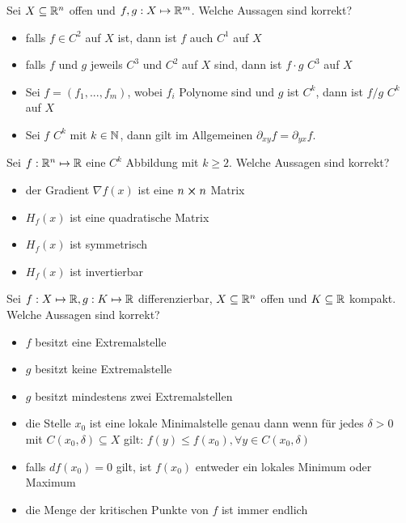 \hrulefill

Sei $X \subseteq \mathbb{R}^n$ offen und $f,g: X \mapsto \mathbb{R}^m$. Welche Aussagen sind korrekt?
\begin{itemize}
    \item[\rlap{\raisebox{0.3ex}{\hspace{0.4ex}\tiny \ding{52}}}$\square$] falls $f \in C^2$
    auf $X$ ist, dann ist $f$ auch $C^1$ auf $X$
    \item[$\square$] falls $f$ und $g$ jeweils $C^3$ und $C^2$ auf $X$ sind, dann ist
    $f \cdot g$ $C^3$ auf $X$
    \item[\rlap{\raisebox{0.3ex}{\hspace{0.4ex}\tiny \ding{52}}}$\square$] Sei $f = (f_1, 
    ..., f_m)$, wobei $f_i$ Polynome sind und $g$ ist $C^k$, dann ist $f/g$ $C^k$ auf $X$
    \item[\rlap{\raisebox{0.3ex}{\hspace{0.4ex}\tiny \ding{52}}}$\square$] Sei $f$ $C^k$ mit 
    $k \in \mathbb{N}$, dann gilt im Allgemeinen $\partial_{xy} f = \partial_{yx} f$.
\end{itemize}

\hrulefill

Sei $f: \mathbb{R}^n \mapsto \mathbb{R}$ eine $C^k$ Abbildung mit $k \geq 2$. Welche Aussagen sind korrekt?
\begin{itemize}
    \item[$\square$] der Gradient $\nabla f(x)$ ist eine $n \cross n$ Matrix
    \item[\rlap{\raisebox{0.3ex}{\hspace{0.4ex}\tiny \ding{52}}}$\square$] $H_f(x)$ ist eine
    quadratische Matrix
    \item[\rlap{\raisebox{0.3ex}{\hspace{0.4ex}\tiny \ding{52}}}$\square$] $H_f(x)$ ist 
    symmetrisch
    \item[$\square$] $H_f(x)$ ist invertierbar
\end{itemize}

\hrulefill

Sei $f: X \mapsto \mathbb{R}, g: K \mapsto \mathbb{R}$ differenzierbar, $X \subseteq \mathbb{R}^n$ offen und $K
\subseteq \mathbb{R}$ kompakt. Welche Aussagen sind korrekt?
\begin{itemize}
    \item[$\square$] $f$ besitzt eine Extremalstelle
    \item[$\square$] $g$ besitzt keine Extremalstelle
    \item[\rlap{\raisebox{0.3ex}{\hspace{0.4ex}\tiny \ding{52}}}$\square$] $g$ besitzt
    mindestens zwei Extremalstellen
    \item[$\square$] die Stelle $x_0$ ist eine lokale Minimalstelle genau dann wenn für jedes
    $\delta > 0$ mit $C(x_0, \delta) \subseteq X$ gilt: $f(y) \leq f(x_0), \forall y \in 
    C(x_0, \delta)$
    \item[$\square$] falls $df(x_0) = 0$ gilt, ist $f(x_0)$ entweder ein lokales Minimum oder
    Maximum
    \item[$\square$] die Menge der kritischen Punkte von $f$ ist immer endlich
\end{itemize}

